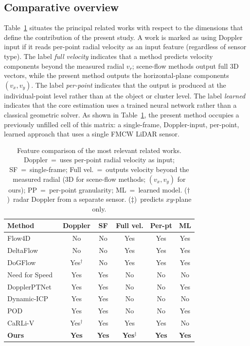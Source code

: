 \documentclass[a4paper,12pt]{article}
\begin{document}
\subsection{Comparative overview}

Table~\ref{tab:feature_matrix} situates the principal related works with respect to the dimensions that define the contribution of the present study. A work is marked as using Doppler input if it reads per-point radial velocity as an input feature (regardless of sensor type). The label \textit{full velocity} indicates that a method predicts velocity components beyond the measured radial $v_r$; scene-flow methods output full 3D vectors, while the present method outputs the horizontal-plane components $(v_x, v_y)$. The label \textit{per-point} indicates that the output is produced at the individual-point level rather than at the object or cluster level. The label \textit{learned} indicates that the core estimation uses a trained neural network rather than a classical geometric solver. As shown in Table~\ref{tab:feature_matrix}, the present method occupies a previously unfilled cell of this matrix: a single-frame, Doppler-input, per-point, learned approach that uses a single FMCW LiDAR sensor.

\begin{table}[ht]
\centering
\caption{Feature comparison of the most relevant related works. Doppler~=~uses per-point radial velocity as input; SF~=~single-frame; Full vel.~=~outputs velocity beyond the measured radial (3D for scene-flow methods; $(v_x,v_y)$ for ours); PP~=~per-point granularity; ML~=~learned model. ($\dagger$)~radar Doppler from a separate sensor. ($\ddagger$)~predicts $xy$-plane only.}
\label{tab:feature_matrix}
\small
\begin{tabular}{l c c c c c}
\toprule
Method & Doppler & SF & Full vel. & Per-pt & ML \\
\midrule
Flow4D~\cite{cho2025flow4d}                     & No            & No  & Yes & Yes & Yes \\
DeltaFlow~\cite{zhang2025deltaflow}              & No            & No  & Yes & Yes & Yes \\
DoGFlow~\cite{khoche2026dogflow}                 & Yes$^\dagger$ & No  & Yes & Yes & Yes \\
Need for Speed~\cite{yoon2023needforspeed}       & Yes           & Yes & No  & No  & No  \\
DopplerPTNet~\cite{dopplerptnet2024}             & Yes           & Yes & No  & No  & Yes \\
Dynamic-ICP~\cite{dynamicicp2025}                & Yes           & Yes & No  & No  & No  \\
POD~\cite{pod2025}                               & Yes           & Yes & No  & No  & Yes \\
CaRLi-V~\cite{zhou2025carliv}                   & Yes$^\dagger$ & Yes & Yes & Yes & No  \\
\midrule
\textbf{Ours} & \textbf{Yes} & \textbf{Yes} & \textbf{Yes}$^\ddagger$ & \textbf{Yes} & \textbf{Yes} \\
\bottomrule
\end{tabular}
\end{table}
\end{document}
